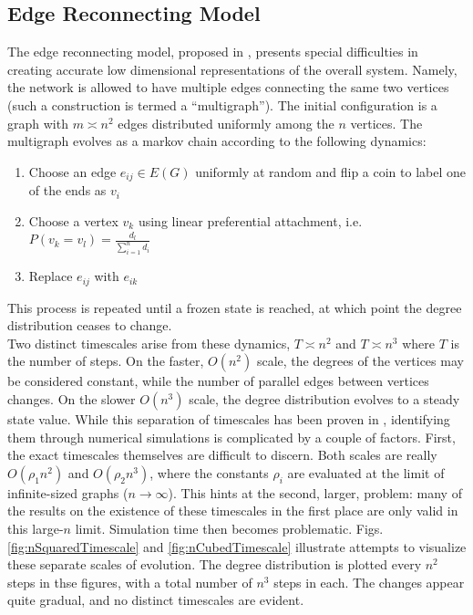 \documentclass[11pt]{article}
\begin{document}
\subsection{Edge Reconnecting Model}
The edge reconnecting model, proposed in \cite{balazs'paper}, presents special difficulties in creating accurate low dimensional representations of the overall system. Namely, the network is allowed to have multiple edges connecting the same two vertices (such a construction is termed a ``multigraph''). The initial configuration is a graph with $m\asymp n^{2}$ edges distributed uniformly among the $n$ vertices. The multigraph evolves as a markov chain according to the following dynamics:
\begin{enumerate}
\item Choose an edge $e_{ij} \in E(G)$ uniformly at random and flip a coin to label one of the ends as $v_{i}$
\item Choose a vertex $v_{k}$ using linear preferential attachment, i.e. $P(v_{k} = v_{l}) = \frac{d_{l}}{\sum\limits_{i=1}^{n} d_{i}}$
\item Replace $e_{ij}$ with $e_{ik}$
\end{enumerate}
This process is repeated until a frozen state is reached, at which point the degree distribution ceases to change.\vspace{1mm}\\
Two distinct timescales arise from these dynamics, $T\asymp n^{2}$ and $T\asymp n^{3}$ where $T$ is the number of steps. On the faster, $O(n^{2})$ scale, the degrees of the vertices may be considered constant, while the number of parallel edges between vertices changes. On the slower $O(n^{3})$ scale, the degree distribution evolves to a steady state value. While this separation of timescales has been proven in \cite{balazs:rsa12}, identifying them through numerical simulations is complicated by a couple of factors. First, the exact timescales themselves are difficult to discern. Both scales are really $O(\rho_{1} n^{2})$ and $O(\rho_{2} n^{3})$, where the constants $\rho_{i}$ are evaluated at the limit of infinite-sized graphs ($n\rightarrow \infty$). This hints at the second, larger, problem: many of the results on the existence of these timescales in the first place are only valid in this large-$n$ limit. Simulation time then becomes problematic. Figs. \ref{fig:nSquaredTimescale} and \ref{fig:nCubedTimescale} illustrate attempts to visualize these separate scales of evolution. The degree distribution is plotted every $n^{2}$ steps in thse figures, with a total number of $n^{3}$ steps in each. The changes appear quite gradual, and no distinct timescales are evident.\\
\end{document}

